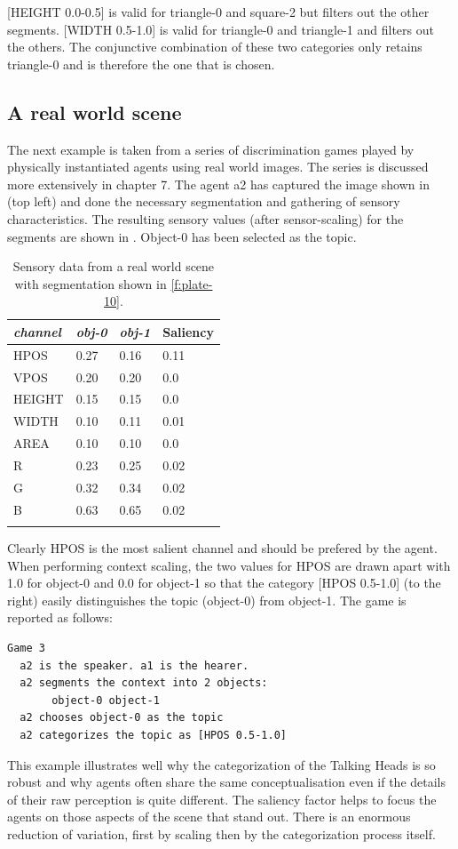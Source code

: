 [HEIGHT 0.0-0.5] is valid for triangle-0 and square-2 but
filters out the other segments. 
[WIDTH 0.5-1.0] is valid for triangle-0 and triangle-1 and 
filters out the others.  
The conjunctive combination of these two categories only 
retains triangle-0 and is therefore the one that is chosen. 

\subsection{A real world scene}

The next example is taken from a series of discrimination 
games played by physically instantiated agents using 
real world images. The series is discussed more extensively 
in chapter 7. The agent {\bfshape a2} has 
captured the image shown in 
(top left) and done the necessary segmentation and 
gathering of sensory characteristics. The resulting sensory
values (after sensor-scaling) for the segments are shown
in . Object-0 has been selected as the topic. 

\begin{table}
\begin{center}
\begin{tabular}{ l  l  l  l }
\lsptoprule
{\itshape channel}& {\itshape obj-0} & {\itshape obj-1} & Saliency\\ \midrule
HPOS & 0.27 & 0.16 & 0.11\\ 
VPOS & 0.20 & 0.20 & 0.0\\ 
HEIGHT & 0.15 & 0.15 & 0.0\\ 
WIDTH & 0.10 & 0.11 & 0.01\\ 
AREA & 0.10 & 0.10 & 0.0\\ 
R & 0.23 & 0.25 & 0.02\\ 
G & 0.32 & 0.34  & 0.02\\ 
B & 0.63 & 0.65 & 0.02\\ 
\lspbottomrule
\end{tabular}
\caption{\label{tab:t-real} Sensory data from a real world scene with segmentation shown in \ref{f:plate-10}.}
\end{center}
\end{table}
Clearly HPOS is the most salient channel and should be 
prefered by the agent. When performing context scaling, 
the two values for HPOS are drawn apart with 1.0 for object-0 and 
0.0 for object-1 so that the category [HPOS 0.5-1.0] (to the 
right) easily distinguishes the topic (object-0) from
object-1. The game is reported as follows: 
\begin{verbatim}
Game 3 
  a2 is the speaker. a1 is the hearer. 
  a2 segments the context into 2 objects: 
       object-0 object-1
  a2 chooses object-0 as the topic 
  a2 categorizes the topic as [HPOS 0.5-1.0]
\end{verbatim}
This example illustrates well why the categorization 
of the Talking Heads is so robust and why agents 
often share the same conceptualisation even if the details  
of their raw perception is quite different. 
The saliency factor helps to focus the agents on those
aspects of the scene that stand out. There is 
an enormous reduction of variation, first by scaling then by 
the categorization process itself. 


